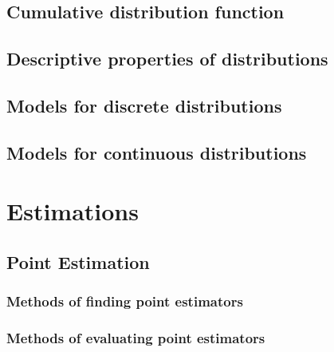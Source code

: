 \documentclass[]{book}
\begin{document}
\hypertarget{cumulative-distribution-function}{%
\section{Cumulative distribution function}\label{cumulative-distribution-function}}

\hypertarget{descriptive-properties-of-distributions}{%
\section{Descriptive properties of distributions}\label{descriptive-properties-of-distributions}}

\hypertarget{models-for-discrete-distributions}{%
\section{Models for discrete distributions}\label{models-for-discrete-distributions}}

\hypertarget{models-for-continuous-distributions}{%
\section{Models for continuous distributions}\label{models-for-continuous-distributions}}

\hypertarget{estimations}{%
\chapter{Estimations}\label{estimations}}

\hypertarget{point-estimation}{%
\section{Point Estimation}\label{point-estimation}}

\hypertarget{methods-of-finding-point-estimators}{%
\subsection{Methods of finding point estimators}\label{methods-of-finding-point-estimators}}

\hypertarget{methods-of-evaluating-point-estimators}{%
\subsection{Methods of evaluating point estimators}\label{methods-of-evaluating-point-estimators}}
\end{document}
